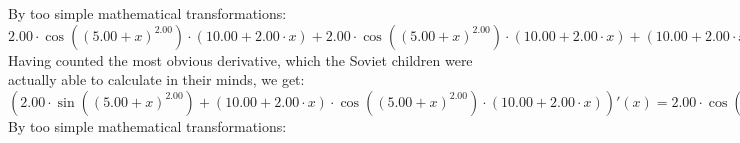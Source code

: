 \documentclass{article}
\begin{document}
\newline
By too simple mathematical transformations:
 ${{{2.00} \cdot { \cos {\left({\left({{5.00} + {x}}\right) ^ {2.00}}\right)}  \cdot \left({{10.00} + {{2.00} \cdot {x}}}\right)}} + {{{2.00} \cdot { \cos {\left({\left({{5.00} + {x}}\right) ^ {2.00}}\right)}  \cdot \left({{10.00} + {{2.00} \cdot {x}}}\right)}} + {\left({{10.00} + {{2.00} \cdot {x}}}\right) \cdot \left({{\left({-1.00}\right) \cdot {\left({{10.00} + {{2.00} \cdot {x}}}\right) \cdot {\left({{10.00} + {{2.00} \cdot {x}}}\right) \cdot  \sin {\left({\left({{5.00} + {x}}\right) ^ {2.00}}\right)} }}} + {{2.00} \cdot  \cos {\left({\left({{5.00} + {x}}\right) ^ {2.00}}\right)} }}\right)}}} = {{{2.00} \cdot { \cos {\left({\left({{5.00} + {x}}\right) ^ {2.00}}\right)}  \cdot \left({{10.00} + {{2.00} \cdot {x}}}\right)}} + {{{2.00} \cdot { \cos {\left({\left({{5.00} + {x}}\right) ^ {2.00}}\right)}  \cdot \left({{10.00} + {{2.00} \cdot {x}}}\right)}} + {\left({{10.00} + {{2.00} \cdot {x}}}\right) \cdot \left({{\left({-1.00}\right) \cdot {\left({{10.00} + {{2.00} \cdot {x}}}\right) \cdot {\left({{10.00} + {{2.00} \cdot {x}}}\right) \cdot  \sin {\left({\left({{5.00} + {x}}\right) ^ {2.00}}\right)} }}} + {{2.00} \cdot  \cos {\left({\left({{5.00} + {x}}\right) ^ {2.00}}\right)} }}\right)}}}$ 
 \newline
 \newline 
Having counted the most obvious derivative, which the Soviet children were actually able to calculate in their minds, we get:
$({{{2.00} \cdot  \sin {\left({\left({{5.00} + {x}}\right) ^ {2.00}}\right)} } + {\left({{10.00} + {{2.00} \cdot {x}}}\right) \cdot { \cos {\left({\left({{5.00} + {x}}\right) ^ {2.00}}\right)}  \cdot \left({{10.00} + {{2.00} \cdot {x}}}\right)}}})'(x) = {{{2.00} \cdot { \cos {\left({\left({{5.00} + {x}}\right) ^ {2.00}}\right)}  \cdot \left({{10.00} + {{2.00} \cdot {x}}}\right)}} + {{{2.00} \cdot { \cos {\left({\left({{5.00} + {x}}\right) ^ {2.00}}\right)}  \cdot \left({{10.00} + {{2.00} \cdot {x}}}\right)}} + {\left({{10.00} + {{2.00} \cdot {x}}}\right) \cdot \left({{\left({-1.00}\right) \cdot {\left({{10.00} + {{2.00} \cdot {x}}}\right) \cdot {\left({{10.00} + {{2.00} \cdot {x}}}\right) \cdot  \sin {\left({\left({{5.00} + {x}}\right) ^ {2.00}}\right)} }}} + {{2.00} \cdot  \cos {\left({\left({{5.00} + {x}}\right) ^ {2.00}}\right)} }}\right)}}}$\newline
\newline
By too simple mathematical transformations:
\end{document}
